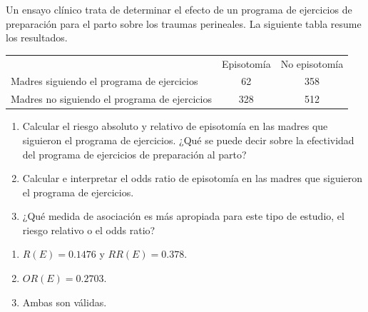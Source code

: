 {Un ensayo clínico trata de determinar el efecto de un programa de ejercicios de preparación para el parto sobre los traumas perineales.
La siguiente tabla resume los resultados.
\begin{center}
	\begin{tabular}{lcc}
		\toprule
		 & Episotomía & No episotomía\\
		 Madres siguiendo el programa de ejercicios & 62 & 358 \\
		 Madres no siguiendo el programa de ejercicios & 328 & 512\\
		\bottomrule
	\end{tabular}
\end{center}

\begin{enumerate}
\item Calcular el riesgo absoluto y relativo de episotomía en las madres que siguieron el programa de ejercicios.
¿Qué se puede decir sobre la efectividad del programa de ejercicios de preparación al parto?
\item Calcular e interpretar el odds ratio de episotomía en las madres que siguieron el programa de ejercicios.
\item ¿Qué medida de asociación es más apropiada para este tipo de estudio, el riesgo relativo o el odds ratio?
\end{enumerate}
}
{
\begin{enumerate}
\item $R(E)=0.1476$ y $RR(E)=0.378$.
\item $OR(E)=0.2703$.
\item Ambas son válidas.
\end{enumerate}
}
{}

